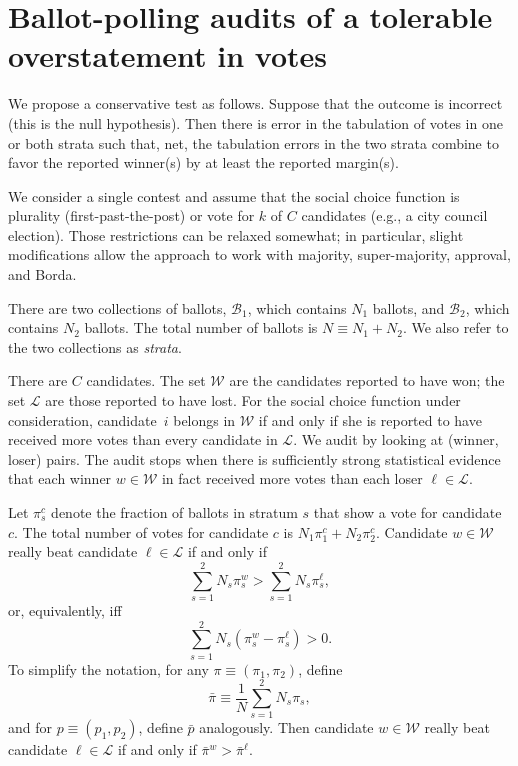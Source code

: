 \documentclass[12pt]{article}
\newcommand{\beq}{\begin{equation}}
\newcommand{\eeq}{\end{equation}}
\newcommand{\mc}[1]{\ensuremath{\mathcal{#1}}}
\newcommand{\bpi}{\bar{\pi}}
\newcommand{\bp}{\bar{p}}
\begin{document}





\section{Ballot-polling audits of a tolerable overstatement in votes}
\label{sec:ballotPollError}

We propose a conservative test as follows. 
Suppose that the outcome is incorrect (this is the null hypothesis).
Then there is error in the tabulation of votes in one or both strata such that, net,
the tabulation errors in the two strata combine to favor the reported winner(s)
by at least the reported margin(s).

We consider a single contest and assume that the
social choice function is plurality (first-past-the-post)
or vote for $k$ of $C$ candidates (e.g., a city council election).
Those restrictions can be relaxed somewhat; in particular, slight modifications allow
the approach to work with majority, super-majority, approval, and Borda.

There are two collections of ballots, $\mc{B}_1$, which contains $N_1$ ballots, 
and $\mc{B}_2$, which contains $N_2$ ballots.
The total number of ballots is $N \equiv N_1 + N_2$.
We also refer to the two collections as \emph{strata}.

There are $C$ candidates.
The set $\mc{W}$ are the candidates reported to have won; the set $\mc{L}$ are those
reported to have lost.
For the social choice function under consideration, candidate~$i$ belongs in $\mc{W}$ if and
only if she is reported to have received more votes than every candidate in $\mc{L}$.
We audit by looking at (winner, loser) pairs.
The audit stops when there is sufficiently strong statistical evidence that each winner 
$w \in \mc{W}$ in fact received more votes
than each loser $\ell \in \mc{L}$.

Let $\pi_s^c$ denote the fraction of ballots in stratum $s$ that show a vote for candidate $c$.
The total number of votes for candidate $c$ is $N_1 \pi_1^c + N_2 \pi_2^c$.
Candidate $w \in \mc{W}$ really beat candidate $\ell \in \mc{L}$ if and only if
\beq
    \sum_{s=1}^2 N_s \pi_s^w > \sum_{s=1}^2 N_s \pi_s^\ell,
\eeq
or, equivalently, iff
\beq
    \sum_{s=1}^2 N_s (\pi_s^w-\pi_s^\ell) > 0.
\eeq
To simplify the notation, for any $\pi \equiv (\pi_1, \pi_2)$, define 
\beq
    \bpi \equiv \frac{1}{N}\sum_{s=1}^2 N_s \pi_s,
\eeq
and for $p \equiv (p_1, p_2)$, define $\bp$ analogously.
Then candidate $w \in \mc{W}$ really beat candidate $\ell \in \mc{L}$ if and only if
$\bpi^w > \bpi^\ell$.
\end{document}
